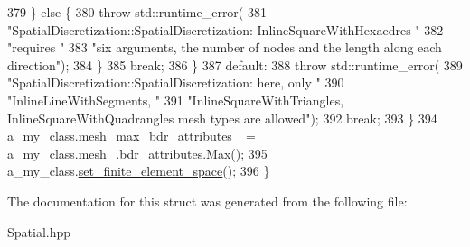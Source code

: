 \begin{DoxyCode}
379         \} \textcolor{keywordflow}{else} \{
380           \textcolor{keywordflow}{throw} std::runtime\_error(
381               \textcolor{stringliteral}{"SpatialDiscretization::SpatialDiscretization: InlineSquareWithHexaedres "}
382               \textcolor{stringliteral}{"requires "}
383               \textcolor{stringliteral}{"six arguments, the number of nodes and the length along each direction"});
384         \}
385         \textcolor{keywordflow}{break};
386       \}
387       \textcolor{keywordflow}{default}:
388         \textcolor{keywordflow}{throw} std::runtime\_error(
389             \textcolor{stringliteral}{"SpatialDiscretization::SpatialDiscretization: here, only "}
390             \textcolor{stringliteral}{"InlineLineWithSegments, "}
391             \textcolor{stringliteral}{"InlineSquareWithTriangles, InlineSquareWithQuadrangles mesh types are allowed"});
392         \textcolor{keywordflow}{break};
393     \}
394     a\_my\_class.mesh\_max\_bdr\_attributes\_ = a\_my\_class.mesh\_.bdr\_attributes.Max();
395     a\_my\_class.\hyperlink{classSpatialDiscretization_a8400a265a094312b4d57708d44f9d627}{set\_finite\_element\_space}();
396   \}
\end{DoxyCode}


The documentation for this struct was generated from the following file\+:\begin{DoxyCompactItemize}
\item 
Spatial.\+hpp\end{DoxyCompactItemize}
